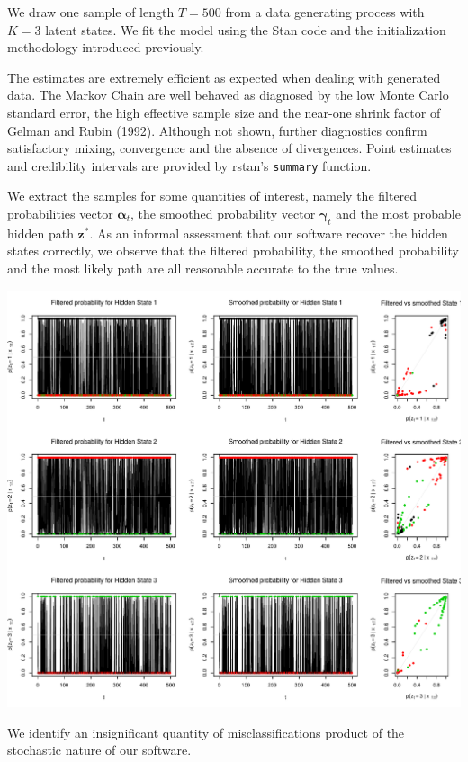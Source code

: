 \documentclass[]{article}
\newcommand{\mat}[1]{\mathbf{#1}}
\begin{document}
We draw one sample of length \(T = 500\) from a data generating process
with \(K = 3\) latent states. We fit the model using the Stan code and
the initialization methodology introduced previously.

The estimates are extremely efficient as expected when dealing with
generated data. The Markov Chain are well behaved as diagnosed by the
low Monte Carlo standard error, the high effective sample size and the
near-one shrink factor of Gelman and Rubin (1992). Although not shown,
further diagnostics confirm satisfactory mixing, convergence and the
absence of divergences. Point estimates and credibility intervals are
provided by rstan's \texttt{summary} function.

We extract the samples for some quantities of interest, namely the
filtered probabilities vector \(\mat{\alpha}_t\), the smoothed
probability vector \(\mat{\gamma}_t\) and the most probable hidden path
\(\mat{z}^*\). As an informal assessment that our software recover the
hidden states correctly, we observe that the filtered probability, the
smoothed probability and the most likely path are all reasonable
accurate to the true values.

\includegraphics[width=\textwidth]{main_pdf_files/figure-latex/hmm_walkthrough_stateprobability-1}

We identify an insignificant quantity of misclassifications product of
the stochastic nature of our software.
\end{document}
